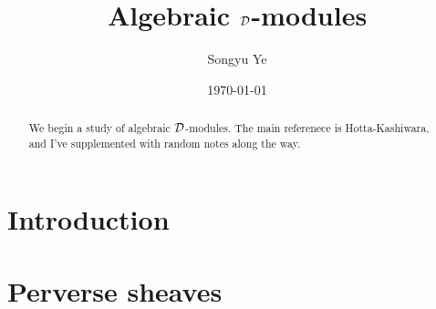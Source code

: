 \documentclass[12pt]{article}
\begin{document}
\rhead{\today}
\cfoot{\thepage}

\title{Algebraic ${\mathcal{D}}$-modules}

\author{Songyu Ye}
\date{\today}
\maketitle


\begin{abstract}
	We begin a study of algebraic ${\mathcal{D}}$-modules. The main referenece is Hotta-Kashiwara, and I've supplemented
	with random notes along the way.
\end{abstract}

\tableofcontents

\section{Introduction}



\section{Perverse sheaves}


\end{document}
